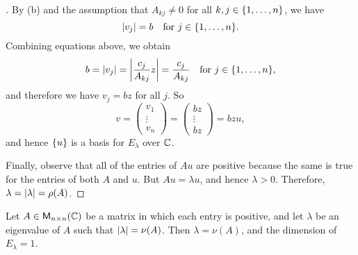 \begin{proof}[]
  By (b) and the assumption that \(A_{k j} \neq 0\) for all \(k, j \in \left\lbrace1, \dots, n\right\rbrace\), we have
  \[
    \abs{v_j} = b \quad \text{for } j \in \set{1, \dots, n}.
  \]
  Combining equations above, we obtain
  \[
    b = \abs{v_j} = \abs{\frac{c_j}{A_{k j}} z} = \frac{c_j}{A_{k j}} \quad \text{for } j \in \set{1, \dots, n},
  \]
  and therefore we have \(v_j = bz\) for all \(j\).
  So
  \[
    v = \begin{pmatrix}
      v_1    \\
      \vdots \\
      v_n
    \end{pmatrix} = \begin{pmatrix}
      bz     \\
      \vdots \\
      bz
    \end{pmatrix} = bzu,
  \]
  and hence \(\left\lbrace u\right\rbrace\) is a basis for \(E_{\lambda}\) over \(\mathbb{C}\).

  Finally, observe that all of the entries of \(Au\) are positive because the same is true for the entries of both \(A\) and \(u\).
  But \(Au = \lambda u\), and hence \(\lambda > 0\).
  Therefore, \(\lambda = \left\lvert\lambda\right\rvert = \rho(A)\).
\end{proof}

\begin{cor}\label{5.3.13}
  Let \(A \in \mathsf{M}_{{n} \times n}({\mathbb{C}})\) be a matrix in which each entry is positive, and let \(\lambda\) be an eigenvalue of \(A\) such that \(\left\lvert\lambda\right\rvert = \nu(A)\).
  Then \(\lambda = \nu(A)\), and the dimension of \(E_{\lambda} = 1\).
\end{cor}

